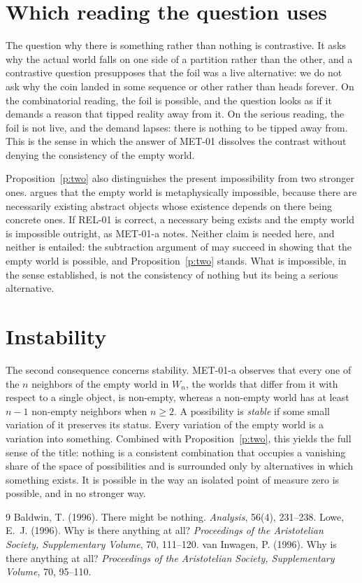 \documentclass{situationist-preprint}
\begin{document}
\section{Which reading the question uses}

The question why there is something rather than nothing is contrastive. It asks why the actual world falls on one side of a partition rather than the other, and a contrastive question presupposes that the foil was a live alternative: we do not ask why the coin landed in some sequence or other rather than heads forever. On the combinatorial reading, the foil is possible, and the question looks as if it demands a reason that tipped reality away from it. On the serious reading, the foil is not live, and the demand lapses: there is nothing to be tipped away from. This is the sense in which the answer of MET-01 dissolves the contrast without denying the consistency of the empty world.

Proposition~\ref{p:two} also distinguishes the present impossibility from two stronger ones. \citet{Lowe1996} argues that the empty world is metaphysically impossible, because there are necessarily existing abstract objects whose existence depends on there being concrete ones. If REL-01 is correct, a necessary being exists and the empty world is impossible outright, as MET-01-a notes. Neither claim is needed here, and neither is entailed: the subtraction argument of \citet{Baldwin1996} may succeed in showing that the empty world is possible, and Proposition~\ref{p:two} stands. What is impossible, in the sense established, is not the consistency of nothing but its being a serious alternative.

\section{Instability}

The second consequence concerns stability. MET-01-a observes that every one of the $n$ neighbors of the empty world in $W_n$, the worlds that differ from it with respect to a single object, is non-empty, whereas a non-empty world has at least $n - 1$ non-empty neighbors when $n \geq 2$. A possibility is \emph{stable} if some small variation of it preserves its status. Every variation of the empty world is a variation into something. Combined with Proposition~\ref{p:two}, this yields the full sense of the title: nothing is a consistent combination that occupies a vanishing share of the space of possibilities and is surrounded only by alternatives in which something exists. It is possible in the way an isolated point of measure zero is possible, and in no stronger way.

\begin{thebibliography}{9}\small
{} Baldwin, T. (1996). There might be nothing. \emph{Analysis}, 56(4), 231--238.
 Lowe, E.~J. (1996). Why is there anything at all? \emph{Proceedings of the Aristotelian Society, Supplementary Volume}, 70, 111--120.
 van Inwagen, P. (1996). Why is there anything at all? \emph{Proceedings of the Aristotelian Society, Supplementary Volume}, 70, 95--110.
\end{thebibliography}
\end{document}
